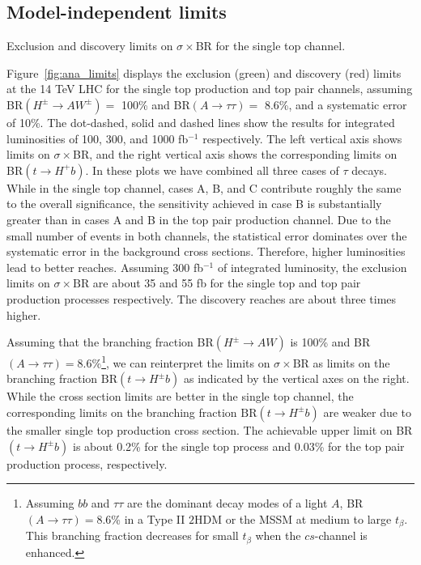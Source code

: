 \subsection{Model-independent limits}\label{subsec:ana_limits}

\begin{marginfigure}[-2in]
  \caption{Exclusion and discovery limits on $\sigma\times$BR for the single top channel.}
  \label{fig:ana_limits}
\end{marginfigure}

Figure~\ref{fig:ana_limits} displays the exclusion (green) and discovery (red) limits at the 14 TeV LHC for the single top production and top pair channels, assuming BR$(H^\pm\rightarrow AW^\pm) =$ 100\% and BR$(A\rightarrow\tau\tau) =$ 8.6\%, and a systematic error of 10\%. The dot-dashed, solid and dashed lines show the results for integrated luminosities of 100, 300, and 1000 fb$^{-1}$ respectively. The left vertical axis shows limits on $\sigma\times$BR, and the right vertical axis shows the corresponding limits on BR$(t\rightarrow H^+ b)$. In these plots we have combined all three cases of $\tau$ decays. While in the single top channel, cases A, B, and C contribute roughly the same to the overall significance, the sensitivity achieved in case B is substantially greater than in cases A and B in the top pair production channel. Due to the small number of events in both channels, the statistical error dominates over the systematic error in the background cross sections. Therefore, higher luminosities lead to better reaches. Assuming 300 fb$^{-1}$ of integrated luminosity, the exclusion limits on $\sigma\times\text{BR}$ are about 35 and 55 fb for the single top and top pair production processes respectively. The discovery reaches are about three times higher. 

Assuming that the branching fraction BR$(H^{\pm} \rightarrow A W )$ is 100\% and BR$(A \rightarrow \tau\tau)=8.6\%$\footnote{Assuming $bb$ and $\tau\tau$ are the dominant decay modes of a light $A$, BR$(A \rightarrow \tau\tau)=8.6$\% in a Type II $2$HDM or the MSSM at medium to large $t_{\beta}$. This branching fraction decreases for small $t_{\beta}$ when the $cs$-channel is enhanced.}, we can reinterpret the limits on $\sigma\times\text{BR}$ as limits on the branching fraction $\text{BR}(t \rightarrow H^{\pm} b)$ as indicated by the vertical axes on the right. While the cross section limits are better in the single top channel, the corresponding limits on the branching fraction $\text{BR}(t \rightarrow H^{\pm} b)$ are weaker due to the smaller single top production cross section. The achievable upper limit on BR$(t \rightarrow H^{\pm} b)$ is about 0.2\% for the single top process and 0.03\% for the top pair production process, respectively.


